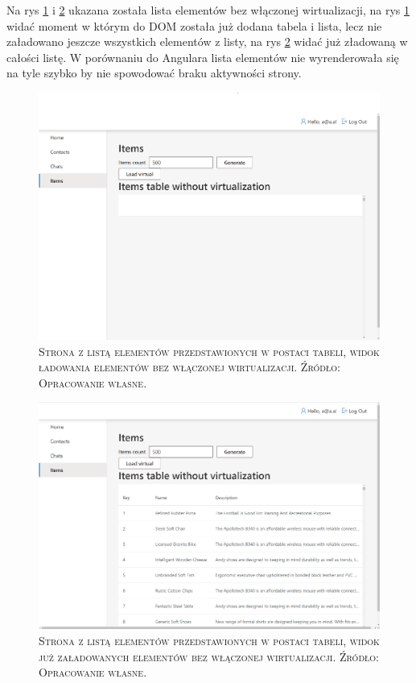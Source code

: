 \documentclass[12pt,a4paper,oneside]{book}
\newcommand{\captionT}[1]{\caption{\textsc{\footnotesize{#1}}}}
\begin{document}
Na rys \ref{rys_app_blazor_list_loading_not_virtual} i \ref{rys_app_blazor_list_not_virtual} ukazana została lista elementów bez włączonej wirtualizacji, na rys \ref{rys_app_blazor_list_loading_not_virtual} widać moment w którym do DOM została już dodana tabela i lista, lecz nie załadowano jeszcze wszystkich elementów z listy, na rys \ref{rys_app_blazor_list_not_virtual} widać już zładowaną w całości listę. W porównaniu do Angulara lista elementów nie wyrenderowała się na tyle szybko by nie spowodować braku aktywności strony.

\begin{figure}[H]
\centering
\includegraphics[width=1\textwidth]{images/BlazorApp/BlazorListaLadowanieBezWirtualizacji.pdf}
\captionT{Strona z listą elementów przedstawionych w postaci tabeli, widok ładowania elementów bez włączonej wirtualizacji. Źródło: Opracowanie własne.}
\label{rys_app_blazor_list_loading_not_virtual}
\end{figure}

\begin{figure}[H]
\centering
\includegraphics[width=1\textwidth]{images/BlazorApp/BlazorListaBezWirtualizacji.pdf}
\captionT{Strona z listą elementów przedstawionych w postaci tabeli, widok już załadowanych elementów bez włączonej wirtualizacji. Źródło: Opracowanie własne.}
\label{rys_app_blazor_list_not_virtual}
\end{figure}
\end{document}
